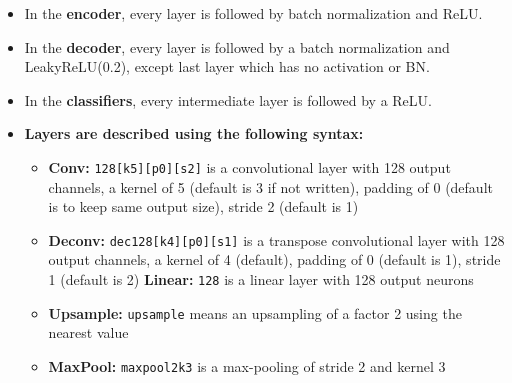 \begin{itemize}
    \item In the \textbf{encoder}, every layer is followed by batch normalization and ReLU.
    \item In the \textbf{decoder}, every layer is followed by a batch normalization and Leaky\-ReLU(0.2), except last layer which has no activation or BN.
    \item In the \textbf{classifiers}, every intermediate layer is followed by a ReLU.
    \item \textbf{Layers are described using the following syntax:}
    \begin{itemize}
    \item \textbf{Conv:} \texttt{128[k5][p0][s2]} is a convolutional layer with 128 output channels, a kernel of 5 (default is 3 if not written), padding of 0 (default is to keep same output size), stride 2 (default is 1)
    \item \textbf{Deconv:} \texttt{dec128[k4][p0][s1]} is a transpose convolutional layer with 128 output channels, a kernel of 4 (default), padding of 0 (default is 1), stride 1 (default is 2)
    \textbf{Linear:} \li\texttt{128} is a linear layer with 128 output neurons
    \item \textbf{Upsample:} \texttt{upsample} means an upsampling of a factor 2 using the nearest value  
    \item \textbf{MaxPool:} \texttt{maxpool2k3} is a max-pooling of stride 2 and kernel 3
    \end{itemize}
\end{itemize}

